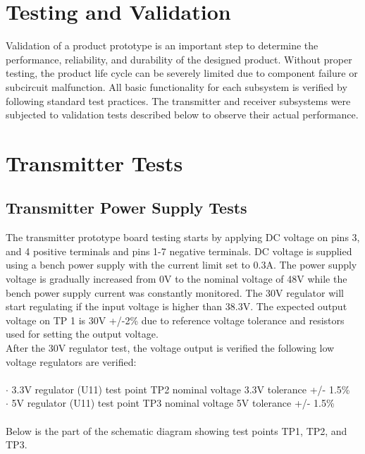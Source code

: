 \documentclass[12pt]{article}
\begin{document}
\section{Testing and Validation}
\indent \indent
Validation of a product prototype is an important step to determine the performance, reliability, and durability of the designed product. Without proper testing, the product life cycle can be severely limited due to component failure or subcircuit malfunction.  All basic functionality for each subsystem is verified by following standard test practices. The transmitter and receiver subsystems were subjected to validation tests described below to observe their actual performance. 


\section*{Transmitter Tests} %
\subsection{Transmitter Power Supply Tests}
\indent \indent
The transmitter prototype board testing starts by applying DC voltage on pins 3, and 4 positive terminals and pins 1-7 negative terminals. DC voltage is supplied using a bench power supply with the current limit set to 0.3A. The power supply voltage is gradually increased from 0V to the nominal voltage of 48V while the bench power supply current was constantly monitored.
The 30V regulator will start regulating if the input voltage is higher than 38.3V. The expected output voltage on TP 1 is 30V +/-2\% due to reference voltage tolerance and resistors used for setting the output voltage.\\

\noindent
After the 30V regulator test, the voltage output is verified the following low voltage regulators are verified:\\
\hfill \\
\indent \indent $\cdot$ 3.3V regulator (U11) test point TP2 nominal voltage 3.3V  tolerance +/- 1.5\% \\
\indent \indent $\cdot$ 5V regulator (U11) test point TP3 nominal voltage 5V  tolerance +/- 1.5\%\\

\pagebreak
\hfill \\
\noindent
Below is the part of the schematic diagram showing test points TP1, TP2, and TP3.
\end{document}

